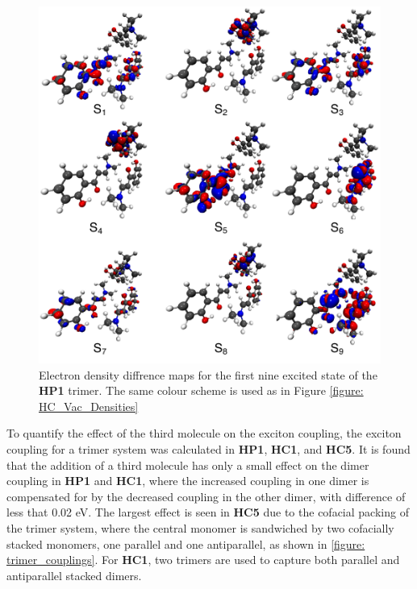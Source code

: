 \begin{figure}[t]
\centering
  \includegraphics[width=0.8\linewidth]{5ConnectingCrystalStructure/trimer_excitations}
  \caption[Electron density diffrence maps for the first nine excited state of the \textbf{HP1} trimer.]{Electron density diffrence maps for the first nine excited state of the \textbf{HP1} trimer. The same colour scheme is used as in Figure \ref{figure: HC_Vac_Densities}}
  \label{figure: trimer_excitations}
\end{figure} 

To quantify the effect of the third molecule on the exciton coupling, the exciton coupling for a trimer system was calculated in \textbf{HP1}, \textbf{HC1}, and \textbf{HC5}. It is found that the addition of a third molecule has only a small effect on the dimer coupling in \textbf{HP1} and \textbf{HC1}, where the increased coupling in one dimer is compensated for by the decreased coupling in the other dimer, with difference of less that 0.02 eV. The largest effect is seen in \textbf{HC5} due to the cofacial packing of the trimer system, where the central monomer is sandwiched by two cofacially stacked monomers, one parallel and one antiparallel, as shown in \ref{figure: trimer_couplings}. For \textbf{HC1}, two trimers are used to capture both parallel and antiparallel stacked dimers. 


